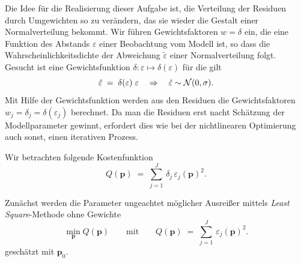 Die Idee für die Realisierung dieser Aufgabe ist, die Verteilung der Residuen durch Umgewichten so zu verändern, das
sie wieder die Gestalt einer Normalverteilung bekommt. Wir führen Gewichtsfaktoren $w = \delta$ ein,
die eine Funktion des Abstands $\varepsilon$ einer Beobachtung vom Modell ist, so dass die Wahrscheinlichkeitsdichte 
der Abweichung $\tilde \varepsilon$ einer Normalverteilung folgt. Gesucht ist eine Gewichtsfunktion
$\delta \! : \varepsilon \mapsto \delta(\varepsilon)$ für die gilt
\begin{equation}
\tilde \varepsilon \; = \; \delta(\varepsilon) \; \varepsilon \quad \Rightarrow
\quad \tilde \varepsilon \sim {\cal N}(0,\sigma) .
\end{equation}
Mit Hilfe der Gewichtsfunktion werden aus den Residuen die Gewichtsfaktoren
$w_j = \delta_j = \delta(\varepsilon_j)$ berechnet. Da man die Residuen erst nacht
Schätzung der Modellparameter gewinnt, erfordert dies wie bei der nichtlinearen Optimierung
auch sonst, einen iterativen Prozess.

Wir betrachten folgende Kostenfunktion
\begin{equation}
Q(\mathbf{p}) \; = \; \sum_{j=1}^J \, \delta_j \, \varepsilon_j(\mathbf{p})^2 .
\label{robustEstim}
\end{equation}

Zunächst werden die Parameter ungeachtet möglicher Ausreißer mittels \textsl{Least Square}-Methode
ohne Gewichte
\begin{equation}
 \min_{\mathbf{p}} Q(\mathbf{p}) \qquad \mathrm{mit} \qquad 
Q(\mathbf{p}) \; = \; \sum_{j=1}^J \, \varepsilon_j(\mathbf{p})^2 .
\label{linEstim}
\end{equation}
geschätzt mit $\mathbf{p}_0$.

